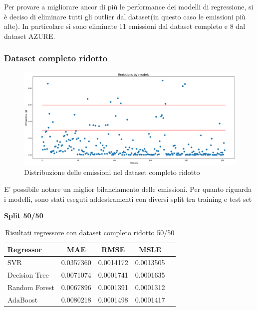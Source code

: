 Per provare a migliorare ancor di più le performance dei modelli di regressione, si è deciso di eliminare tutti gli outlier dal dataset(in questo caso le emissioni più alte). In particolare si sono eliminate 11 emissioni dal dataset completo e 8 dal dataset AZURE.

\subsubsection{Dataset completo ridotto}

\begin{figure}[H]
    \centering
    \includegraphics[scale=0.25]{images/nuova-situazione-ridotto.png}
    \caption{Distribuzione delle emissioni nel dataset completo ridotto}
\end{figure}

E' possibile notare un miglior bilanciamento delle emissioni. Per quanto riguarda i modelli, sono stati eseguti addestramenti con diversi split tra training e test set

\noindent\textbf{Split 50/50}


\begin{table}[H]
    \centering
    \begin{tabular}{|>{\centering\arraybackslash}m{5cm}|c|c|c|c|}
        \hline
        \textbf{Regressor} & \textbf{MAE} & \textbf{RMSE} & \textbf{MSLE} \\ [10pt]
        \hline
        SVR & 0.0357360 & 0.0014172 & 0.0013505 \\ [10pt]
        \hline
        Decision Tree & 0.0071074 & 0.0001741 & 0.0001635 \\ [10pt]
        \hline
        Random Forest & 0.0067896 & 0.0001391 & 0.0001312 \\ [10pt]
        \hline
        AdaBoost & 0.0080218 & 0.0001498 & 0.0001417 \\ [10pt]
        \hline
    \end{tabular}
    \caption{Risultati regressore con dataset completo ridotto 50/50}
    \label{tab:results}
\end{table}


